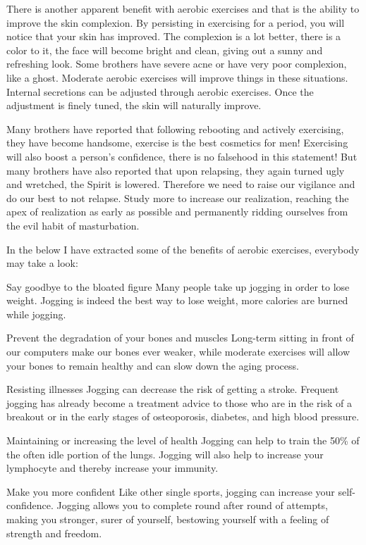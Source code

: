 \documentclass[
]{book}
\begin{document}
There is another apparent benefit with aerobic exercises and that is the ability to improve the skin complexion. By persisting in exercising for a period, you will notice that your skin has improved. The complexion is a lot better, there is a color to it, the face will become bright and clean, giving out a sunny and refreshing look. Some brothers have severe acne or have very poor complexion, like a ghost. Moderate aerobic exercises will improve things in these situations. Internal secretions can be adjusted through aerobic exercises. Once the adjustment is finely tuned, the skin will naturally improve.

Many brothers have reported that following rebooting and actively exercising, they have become handsome, exercise is the best cosmetics for men! Exercising will also boost a person's confidence, there is no falsehood in this statement! But many brothers have also reported that upon relapsing, they again turned ugly and wretched, the Spirit is lowered. Therefore we need to raise our vigilance and do our best to not relapse. Study more to increase our realization, reaching the apex of realization as early as possible and permanently ridding ourselves from the evil habit of masturbation.

In the below I have extracted some of the benefits of aerobic exercises, everybody may take a look:

Say goodbye to the bloated figure
Many people take up jogging in order to lose weight. Jogging is indeed the best way to lose weight, more calories are burned while jogging.

Prevent the degradation of your bones and muscles
Long-term sitting in front of our computers make our bones ever weaker, while moderate exercises will allow your bones to remain healthy and can slow down the aging process.

Resisting illnesses
Jogging can decrease the risk of getting a stroke. Frequent jogging has already become a treatment advice to those who are in the risk of a breakout or in the early stages of osteoporosis, diabetes, and high blood pressure.

Maintaining or increasing the level of health
Jogging can help to train the 50\% of the often idle portion of the lungs. Jogging will also help to increase your lymphocyte and thereby increase your immunity.

Make you more confident
Like other single sports, jogging can increase your self-confidence. Jogging allows you to complete round after round of attempts, making you stronger, surer of yourself, bestowing yourself with a feeling of strength and freedom.
\end{document}
